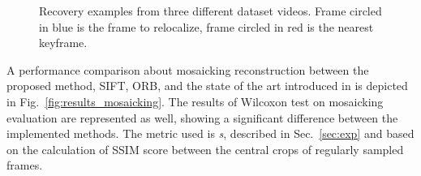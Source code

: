 \documentclass[sn-basic]{sn-jnl}%
\begin{document}
%

\begin{figure}[t!]
    \centering
    \caption{Recovery examples from three different dataset videos. Frame circled in blue is the frame to relocalize, frame circled in red is the nearest keyframe.}
    \label{fig:examples_reloc}
\end{figure}

A performance comparison about mosaicking reconstruction between the proposed method, SIFT, ORB, and the state of the art introduced in \cite{Bano2020} is depicted in Fig.~\ref{fig:results_mosaicking}. The results of Wilcoxon test on mosaicking evaluation are represented as well, showing a significant difference between the implemented methods. The metric used is \textit{s}, described in Sec.~\ref{sec:exp} and based on the calculation of SSIM score between the central crops of regularly sampled frames.
\end{document}
